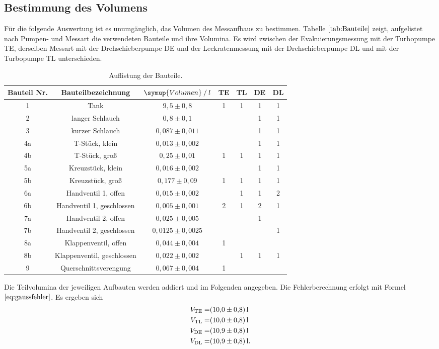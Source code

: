 \subsection{Bestimmung des Volumens}
Für die folgende Auswertung ist es unumgänglich, das Volumen des Messaufbaus zu bestimmen.
Tabelle $\ref{tab:Bauteile}$ zeigt, aufgelistet nach Pumpen- und Messart die verwendeten Bauteile und ihre Volumina.
Es wird zwischen der Evakuierungsmessung mit der Turbopumpe TE, derselben Messart mit der Drehschieberpumpe DE und der Leckratenmessung
mit der Drehschieberpumpe DL und mit der Turbopumpe TL unterschieden.\newline

\begin{table}[!hht]
	\centering
	\begin{tabular}{|c|c|c|c|c|c|c|}
		\hline
		Bauteil Nr. & Bauteilbezeichnung & {$\symup{Volumen} \:/\: l$}& TE & TL & DE & DL\\ \hline
		1	&	Tank & $9,5 \pm 0,8$ & 1 & 1 & 1 & 1 \\ \hline
		2	&	langer Schlauch & $0,8 \pm 0,1$ &  &  & 1 & 1 \\	\hline
		3	&	kurzer Schlauch & $0,087 \pm 0,011$ &  &  & 1 & 1 \\	\hline
		4a	&	T-Stück, klein & $0,013 \pm 0,002$ &  &  & 1 & 1 \\	\hline
		4b	&	T-Stück, groß & $0,25 \pm 0,01$ & 1 & 1 & 1 & 1 \\	\hline
		5a	&	Kreuzstück, klein & $0,016 \pm 0,002$ &  &  & 1 & 1 \\	\hline
		5b	&	Kreuzstück, groß & $0,177 \pm 0,09$ & 1 & 1 & 1 & 1 \\	\hline
		6a	&	Handventil 1, offen & $0,015 \pm 0,002$ &  & 1 & 1 & 2 \\	\hline
		6b	&	Handventil 1, geschlossen & $0,005 \pm 0,001$ &  2 & 1 & 2 & 1 \\	\hline
		7a	&	Handventil 2, offen & $0,025 \pm 0,005$ &  &  & 1 &  \\	\hline
		7b	&	Handventil 2, geschlossen & $0,0125 \pm 0,0025$ &  &  &  & 1 \\	\hline
		8a	&	Klappenventil, offen & $0,044 \pm 0,004$ & 1 &  &  &  \\	\hline
		8b	&	Klappenventil, geschlossen & $0,022 \pm 0,002$ &  & 1 & 1 & 1 \\	\hline
		9	&	Querschnittsverengung & $0,067 \pm 0,004$ & 1 &  &  &  \\	\hline
	\end{tabular}
	\caption{Auflistung der Bauteile.\cite{anleitung}}
	\label{tab:Bauteile}
\end{table}
Die Teilvolumina der jeweiligen Aufbauten werden addiert und im Folgenden angegeben. Die Fehlerberechnung erfolgt mit Formel $\ref{eq:gaussfehler}$.
Es ergeben sich
\begin{align*}
   V_\text{TE}=&\SI{10,0 \pm 0,8}{l}\\
   V_\text{TL}=&\SI{10,0 \pm 0,8}{l}\\
   V_\text{DE}=&\SI{10,9 \pm 0,8}{l}\\
   V_\text{DL}=&\SI{10,9 \pm 0,8}{l}.
\end{align*}
\clearpage
